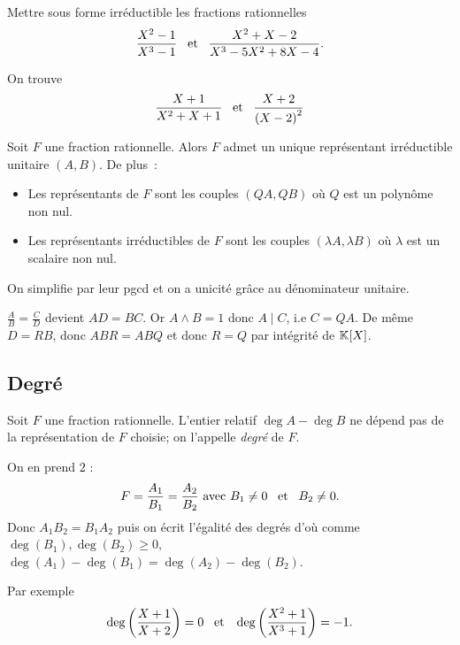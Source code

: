 \documentclass{magnolia}
\begin{document}
\begin{exoUnique}
\exo Mettre sous forme irréductible les fractions rationnelles
  \[\frac{X^2-1}{X^3-1} \quad\!\text{et}\quad\! \frac{X^2+X-2}{X^3-5X^2+8X-4}.\]
  \begin{sol}
  On trouve
  \[\frac{X+1}{X^2+X+1} \quad\!\text{et}\quad\! \frac{X+2}{\left(X-2\right)^2}\]
  \end{sol}
\end{exoUnique}

\begin{proposition}
Soit $F$ une fraction rationnelle. Alors $F$ admet un unique représentant
irréductible unitaire $(A,B)$. De plus~:
\begin{itemize}
\item Les représentants de $F$ sont les couples $(QA,QB)$ où $Q$ est
  un polynôme non nul.
\item Les représentants irréductibles de $F$ sont les couples
  $(\lambda A,\lambda B)$ où $\lambda$ est un scalaire non nul.
\end{itemize}
\end{proposition}

\begin{preuve}
On simplifie par leur pgcd et on a unicité grâce au dénominateur unitaire.

$\frac{A}{B}=\frac{C}{D}$ devient $AD=BC$. Or $A\wedge B=1$ donc $A\mid C$, i.e $C=QA$. De même $D=RB$, donc $ABR=ABQ$ et donc $R=Q$ par intégrité de $\polyK$.
\end{preuve}

\subsection{Degré}
\begin{definition}
Soit $F$ une fraction rationnelle. L'entier relatif $\deg A-\deg B$ ne
dépend pas de la représentation de $F$ choisie; on l'appelle \emph{degré} de $F$.
\end{definition}

\begin{preuve}
On en prend $2$ :
$$F=\dfrac{A_1}{B_1}=\dfrac{A_2}{B_2} \text{ avec } B_1\neq 0 \quad\!\text{et}\quad\! B_2 \neq 0.$$
Donc $A_1B_2=B_1A_2$ puis on écrit l'égalité des degrés d'où comme $\deg(B_1),\deg(B_2)\geq 0$, $\deg(A_1)-\deg(B_1)=\deg(A_2)-\deg(B_2)$.
\end{preuve}

\begin{exempleUnique}
\exemple Par exemple
  \[\deg\left(\frac{X+1}{X+2}\right)=0 \quad\!\text{et}\quad\! \deg\left(\frac{X^2+1}{X^3+1}\right)=-1.\]
\end{exempleUnique}
\end{document}
